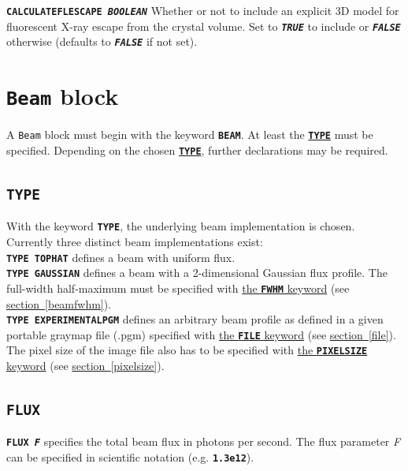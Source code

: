 \documentclass[a4paper]{article}
\newcommand{\Class}[1]{\texttt{#1}\xspace}
\newcommand{\Keyword}[1]{\texttt{\textbf{#1}}\xspace}
\newcommand{\SB}{\\[0.2em]}
\begin{document}
\noindent \Keyword{CALCULATEFLESCAPE \textit{BOOLEAN}}
Whether or not to include an explicit 3D model for fluorescent X-ray escape from the crystal volume. Set to \Keyword{\textit{TRUE}} to include or \Keyword{\textit{FALSE}} otherwise (defaults to \Keyword{\textit{FALSE}} if not set).

\label{RDv3End}


\section{\Class{Beam} block}

A \Class{Beam} block must begin with the keyword \Keyword{BEAM}.
At least the \hyperref[beamtype]{\Keyword{TYPE}} must be specified.
Depending on the chosen \hyperref[beamtype]{\Keyword{TYPE}}, further declarations may be required.


\subsection{\Keyword{TYPE}}
\label{beamtype}

With the keyword \Keyword{TYPE}, the underlying beam implementation is chosen.
Currently three distinct beam implementations exist:\SB

\noindent \Keyword{TYPE TOPHAT} defines a beam with uniform flux.\SB

\noindent \Keyword{TYPE GAUSSIAN} defines a beam with a 2-dimensional Gaussian flux profile. The full-width half-maximum must be specified with \hyperref[beamfwhm]{the \Keyword{FWHM} keyword} (see \hyperref[beamfwhm]{section~\ref*{beamfwhm}}).\SB

\noindent \Keyword{TYPE EXPERIMENTALPGM} defines an arbitrary beam profile as defined in a given portable graymap file (.pgm) specified with \hyperref[file]{the \Keyword{FILE} keyword} (see \hyperref[file]{section~\ref*{file}}). The pixel size of the image file also has to be specified with \hyperref[pixelsize]{the \Keyword{PIXELSIZE} keyword} (see \hyperref[pixelsize]{section~\ref*{pixelsize}}).\SB


\subsection{\Keyword{FLUX}}
\label{flux}

\noindent \Keyword{FLUX \textit{F}} specifies the total beam flux in photons per second. The flux parameter \textit{F} can be specified in scientific notation (e.g. \Keyword{1.3e12}).
\end{document}

